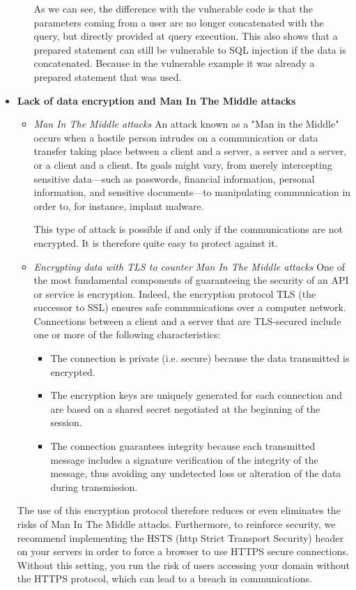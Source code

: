 \begin{itemize}
\begin{itemize}
        As we can see, the difference with the vulnerable code is that the parameters coming from a user are no longer concatenated with the query, but directly provided at query execution. This also shows that a prepared statement can still be vulnerable to SQL injection if the data is concatenated. Because in the vulnerable example it was already a prepared statement that was used.
    \end{itemize}
    \item \textbf{Lack of data encryption and Man In The Middle attacks}
    \begin{itemize}
        \item \textit{Man In The Middle attacks}
        \newline
        An attack known as a "Man in the Middle" occurs when a hostile person intrudes on a communication or data transfer taking place between a client and a server, a server and a server, or a client and a client. Its goals might vary, from merely intercepting sensitive data—such as passwords, financial information, personal information, and sensitive documents—to manipulating communication in order to, for instance, implant malware.

        This type of attack is possible if and only if the communications are not encrypted. It is therefore quite easy to protect against it.
        \item \textit{Encrypting data with TLS to counter Man In The Middle attacks}
        \newline
        One of the most fundamental components of guaranteeing the security of an API or service is encryption. Indeed, the encryption protocol TLS (the successor to SSL) ensures safe communications over a computer network. Connections between a client and a server that are TLS-secured include one or more of the following characteristics:
        \begin{itemize}
            \item The connection is private (i.e. secure) because the data transmitted is encrypted. 
            \item The encryption keys are uniquely generated for each connection and are based on a shared secret negotiated at the beginning of the session.
            \item The connection guarantees integrity because each transmitted message includes a signature verification of the integrity of the message, thus avoiding any undetected loss or alteration of the data during transmission.
        \end{itemize}
    \end{itemize}
    The use of this encryption protocol therefore reduces or even eliminates the risks of Man In The Middle attacks. Furthermore, to reinforce security, we recommend implementing the HSTS (http Strict Transport Security) header on your servers in order to force a browser to use HTTPS secure connections. Without this setting, you run the risk of users accessing your domain without the HTTPS protocol, which can lead to a breach in communications. 
    
\end{itemize}
